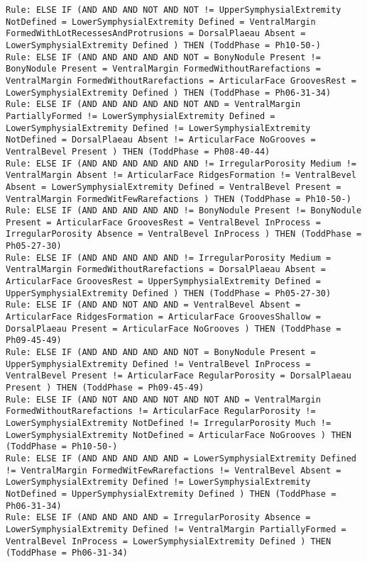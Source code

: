 \begin{lstlisting}
Rule: ELSE IF (AND AND AND NOT AND NOT != UpperSymphysialExtremity NotDefined = LowerSymphysialExtremity Defined = VentralMargin FormedWithLotRecessesAndProtrusions = DorsalPlaeau Absent = LowerSymphysialExtremity Defined ) THEN (ToddPhase = Ph10-50-)
Rule: ELSE IF (AND AND AND AND AND NOT = BonyNodule Present != BonyNodule Present = VentralMargin FormedWithoutRarefactions = VentralMargin FormedWithoutRarefactions = ArticularFace GroovesRest = LowerSymphysialExtremity Defined ) THEN (ToddPhase = Ph06-31-34)
Rule: ELSE IF (AND AND AND AND AND NOT AND = VentralMargin PartiallyFormed != LowerSymphysialExtremity Defined = LowerSymphysialExtremity Defined != LowerSymphysialExtremity NotDefined = DorsalPlaeau Absent != ArticularFace NoGrooves = VentralBevel Present ) THEN (ToddPhase = Ph08-40-44)
Rule: ELSE IF (AND AND AND AND AND AND != IrregularPorosity Medium != VentralMargin Absent != ArticularFace RidgesFormation != VentralBevel Absent = LowerSymphysialExtremity Defined = VentralBevel Present = VentralMargin FormedWitFewRarefactions ) THEN (ToddPhase = Ph10-50-)
Rule: ELSE IF (AND AND AND AND AND != BonyNodule Present != BonyNodule Present = ArticularFace GroovesRest = VentralBevel InProcess = IrregularPorosity Absence = VentralBevel InProcess ) THEN (ToddPhase = Ph05-27-30)
Rule: ELSE IF (AND AND AND AND AND != IrregularPorosity Medium = VentralMargin FormedWithoutRarefactions = DorsalPlaeau Absent = ArticularFace GroovesRest = UpperSymphysialExtremity Defined = UpperSymphysialExtremity Defined ) THEN (ToddPhase = Ph05-27-30)
Rule: ELSE IF (AND AND NOT AND AND = VentralBevel Absent = ArticularFace RidgesFormation = ArticularFace GroovesShallow = DorsalPlaeau Present = ArticularFace NoGrooves ) THEN (ToddPhase = Ph09-45-49)
Rule: ELSE IF (AND AND AND AND AND NOT = BonyNodule Present = UpperSymphysialExtremity Defined != VentralBevel InProcess = VentralBevel Present != ArticularFace RegularPorosity = DorsalPlaeau Present ) THEN (ToddPhase = Ph09-45-49)
Rule: ELSE IF (AND NOT AND AND NOT AND NOT AND = VentralMargin FormedWithoutRarefactions != ArticularFace RegularPorosity != LowerSymphysialExtremity NotDefined != IrregularPorosity Much != LowerSymphysialExtremity NotDefined = ArticularFace NoGrooves ) THEN (ToddPhase = Ph10-50-)
Rule: ELSE IF (AND AND AND AND AND = LowerSymphysialExtremity Defined != VentralMargin FormedWitFewRarefactions != VentralBevel Absent = LowerSymphysialExtremity Defined != LowerSymphysialExtremity NotDefined = UpperSymphysialExtremity Defined ) THEN (ToddPhase = Ph06-31-34)
Rule: ELSE IF (AND AND AND AND = IrregularPorosity Absence = LowerSymphysialExtremity Defined != VentralMargin PartiallyFormed = VentralBevel InProcess = LowerSymphysialExtremity Defined ) THEN (ToddPhase = Ph06-31-34)

\end{lstlisting}
